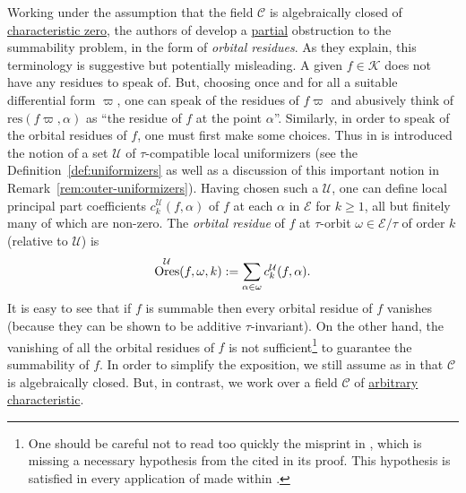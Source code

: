 \documentclass[preprint,12pt]{elsarticle}
\numberwithin{equation}{section} %
\theoremstyle{theorem}
\theoremstyle{definition}
\newcommand{\Ca}{\mathcal{C}} %
\newcommand{\bk}{\mathcal{K}} %
\newcommand{\ec}{\mathcal{E}} %
\newcommand{\orbita}{{\ec/\tau}} %
\DeclareMathOperator{\ores}{Ores}
\begin{document}
Working under the assumption that the field $\Ca$ is algebraically closed of \underline{characteristic zero}, the authors of \cite{Dreyfus2018} develop a \underline{partial} obstruction to the summability problem, in the form of \emph{orbital residues}. As they explain, this terminology is suggestive but potentially misleading. A given $f\in\bk$ does not have any residues to speak of. But, choosing once and for all a suitable differential form $\varpi$, one can speak of the residues of $f\varpi$ and abusively think of $\mathrm{res}(f\varpi,\alpha)$ as ``the residue of $f$ at the point $\alpha$''. Similarly, in order to speak of the orbital residues of $f$, one must first make some choices. Thus in \cite{Dreyfus2018} is introduced the notion of a set $\mathcal{U}$ of $\tau$-compatible local uniformizers (see the Definition~\ref{def:uniformizers} as well as a discussion of this important notion in Remark~\ref{rem:outer-uniformizers}). Having chosen such a $\mathcal{U}$, one can define local principal part coefficients $c^\mathcal{U}_k(f,\alpha)$ of $f$ at each $\alpha$ in $\ec$ for $k\geq 1$, all but finitely many of which are non-zero. The \emph{orbital residue} of $f$ at $\tau$-orbit $\omega\in\orbita$ of order $k$ (relative to $\mathcal{U}$) is \vspace{-.04in}\begin{equation}\label{eq:intro-ores}\ores^\mathcal{U}(f,\omega,k):=\sum_{\alpha\in\omega}c_k^\mathcal{U}(f,\alpha). \vspace{-.04in}\end{equation} It is easy to see that if $f$ is summable then every orbital residue of $f$ vanishes (because they can be shown to be additive $\tau$-invariant). On the other hand, the vanishing of all the orbital residues of $f$ is not sufficient\footnote{One should be careful not to read too quickly the misprint in \cite[Prop.~A.4]{Hardouin2021}, which is missing a necessary hypothesis from the \cite[Lem.~3.7]{Hardouin2021} cited in its proof. This hypothesis is satisfied in every application of \cite[Prop.~A.4]{Hardouin2021} made within \cite{Hardouin2021}.} to guarantee the summability of $f$. In order to simplify the exposition, we still assume as in \cite{Dreyfus2018,Hardouin2021} that $\Ca$ is algebraically closed. But, in contrast, we work over a field $\Ca$ of \underline{arbitrary characteristic}.
\end{document}
